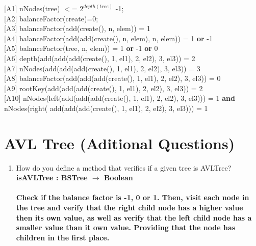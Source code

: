 \documentclass[12pt]{article}
\begin{document}
\begin{spacing}{1.5}
\hspace*{5mm}[A1] nNodes(tree) $<$= $2^{depth(tree)}$ -1;\\
\hspace*{5mm}[A2] balanceFactor(create)=0;\\
\hspace*{5mm} [A3]  balanceFactor(add(create(), n, elem)) = 1\\
\hspace*{5mm} [A4]  balanceFactor(add(add(create(), n, elem), n, elem)) = 1 \textbf{or} -1\\
\hspace*{5mm} [A5]  balanceFactor(tree, n, elem)) = 1 \textbf{or} -1 \textbf{or} 0\\
\hspace*{5mm} [A6]  depth(add(add(add(create(), 1, el1), 2, el2), 3, el3)) = 2\\
\hspace*{5mm} [A7] nNodes(add(add(add(create(), 1, el1), 2, el2), 3, el3)) = 3\\
\hspace*{5mm} [A8] balanceFactor(add(add(add(create(), 1, el1), 2, el2), 3, el3)) = 0 \\
\hspace*{5mm} [A9] rootKey(add(add(add(create(), 1, el1), 2, el2), 3, el3)) = 2\\
\hspace*{5mm} [A10] nNodes(left(add(add(add(create(), 1, el1), 2, el2), 3, el3))) = 1 \textbf{and}  nNodes(right( add(add(add(create(), 1, el1), 2, el2), 3, el3))) = 1\\

\section*{AVL Tree (Aditional Questions)}

\begin{enumerate}

\item How do you define a method that verifies if a given tree is AVLTree?\\
\textbf{isAVLTree : BSTree $\rightarrow$ Boolean} \\ \\
\textbf{Check if the balance factor is -1, 0 or 1. Then, visit each node in the tree and verify that the right child node has a higher value then its own value, as well as verify that the left child node has a smaller value than it own value. Providing that the node has children in the first place.}
  



\end{enumerate}
\end{spacing}
\end{document}
